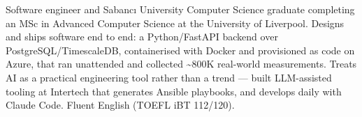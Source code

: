 
\newcommand{\cvprojects}{onepage_projects_backend}



Software engineer and Sabancı University Computer Science graduate completing an MSc in Advanced Computer Science at the University of Liverpool. Designs and ships software end to end: a Python/FastAPI backend over PostgreSQL/TimescaleDB, containerised with Docker and provisioned as code on Azure, that ran unattended and collected \textasciitilde 800K real-world measurements. Treats AI as a practical engineering tool rather than a trend — built LLM-assisted tooling at Intertech that generates Ansible playbooks, and develops daily with Claude Code. Fluent English (TOEFL iBT 112/120).




